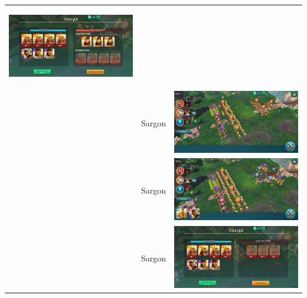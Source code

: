 \begin{longtable}{|c|c|c|}
	\hypertarget{fight31}{\includegraphics[width=0.75\linewidth]{./parts/media/TreasureHunt/31/sargon/photo_2022-04-07_10-05-18.jpg}} \\
	& Sargon &
	\includegraphics[width=0.75\linewidth]{./parts/media/TreasureHunt/31/sargon/photo_2022-04-07_10-05-22.jpg} \\
	& Sargon &
	\includegraphics[width=0.75\linewidth]{./parts/media/TreasureHunt/31/sargon/photo_2022-04-07_10-05-08.jpg} \\
	& Sargon &
	\includegraphics[width=0.75\linewidth]{./parts/media/TreasureHunt/31/sargon/photo_2022-04-07_10-05-25.jpg} \\

\end{longtable}
